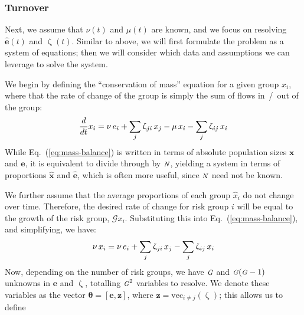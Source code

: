 \documentclass[10pt]{article}
\numberwithin{equation}{section}
\renewcommand{\zeta}{\upzeta}
\newcommand{\N}{{\mbox{\footnotesize{\textit{N}}}}}
\newcommand{\G}{{\mbox{\footnotesize{\textit{G}}}}}
\newcommand{\eq}[1]{Eq.~(\ref{#1})}
\begin{document}
\subsubsection{Turnover}\label{sss:params-turnover}
Next, we assume that $\nu(t)$ and $\mu(t)$ are known,
and we focus on resolving $\bm{\hat{e}}(t)$ and $\zeta(t)$.
Similar to above, we will first formulate the problem as a system of equations;
then we will consider which data and assumptions we can leverage to solve the system.
\par
We begin by defining the ``conservation of mass'' equation for a given group $x_i$,
where that the rate of change of the group
is simply the sum of flows in~/~out of the group:
\begin{equation}\label{eq:mass-balance}
\frac{d}{dt}x_i
= \nu \thinspace e_i + \sum_{j}{\zeta_{ji} \thinspace x_j}
- \mu \thinspace x_i - \sum_{j}{\zeta_{ij} \thinspace x_i}
\end{equation}
While \eq{eq:mass-balance} is written in terms of
absolute population sizes $\bm{x}$ and $\bm{e}$,
it is equivalent to divide through by $\N$, yielding a system in terms of
proportions $\bm{\hat{x}}$ and $\bm{\hat{e}}$,
which is often more useful, since $\N$ need not be known.
\par
We further assume that the average proportions of each group $\hat{x}_i$ do not change over time.
Therefore, the desired rate of change for risk group $i$
will be equal to the growth of the risk group, $\mathcal{G} x_i$.
Substituting this into \eq{eq:mass-balance},
and simplifying, we have:
\begin{equation}\label{eq:system}
\nu \thinspace x_i
= \nu \thinspace e_i + \sum_{j}{\zeta_{ji} \thinspace x_j}
- \sum_{j}{\zeta_{ij} \thinspace x_i}
\end{equation}
Now, depending on the number of risk groups, we have
$\G$ and $\G(\G-1)$ unknowns in $\bm{e}$ and $\zeta$, totalling $\G^2$ variables to resolve.
We denote these variables as the vector $\bm{\theta} = \left[\bm{e}, \bm{z}\right]$,
where $\bm{z} = \mathrm{vec}_{i \ne j}(\zeta)$;
this allows us to define
\end{document}
